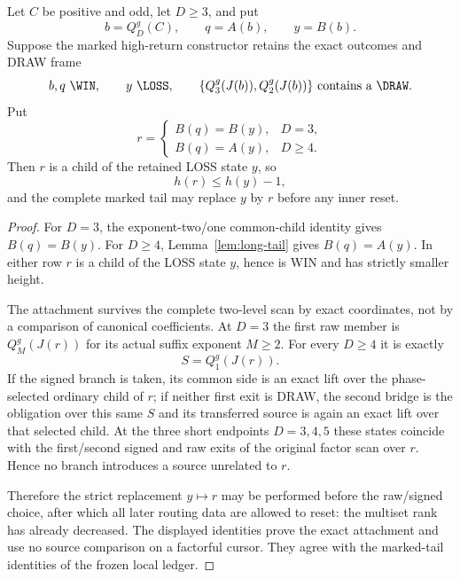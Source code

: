 \begin{lemma}
\label{lem:marked-tail-pay}
Let $C$ be positive and odd, let $D\ge3$, and put
\[
 b=Q_D^g(C),\qquad q=A(b),\qquad y=B(b).
\]
Suppose the marked high-return constructor retains the exact outcomes and
DRAW frame
\[
 b,q\text{ \WIN},\qquad y\text{ \LOSS},\qquad
 \{Q_3^g(J(b)),Q_2^g(J(b))\}\text{ contains a \DRAW}.
\]
Put
\[
 r=\begin{cases}
    B(q)=B(y),&D=3,\\
    B(q)=A(y),&D\ge4.
   \end{cases}
\]
Then $r$ is a \WIN child of the retained LOSS state $y$, so
\[
 h(r)\le h(y)-1,
\]
and the complete marked tail may replace $y$ by $r$ before any inner reset.
\end{lemma}

\begin{proof}
For $D=3$, the exponent-two/one common-child identity gives
$B(q)=B(y)$.  For $D\ge4$, Lemma~\ref{lem:long-tail} gives
$B(q)=A(y)$.  In either row $r$ is a child of the LOSS state $y$, hence is
WIN and has strictly smaller height.

The attachment survives the complete two-level scan by exact coordinates,
not by a comparison of canonical coefficients.  At $D=3$ the first raw
member is $Q_M^g(J(r))$ for its actual suffix exponent $M\ge2$.  For every
$D\ge4$ it is exactly
\[
 S=Q_1^g(J(r)).
\]
If the signed branch is taken, its common side is an exact lift over the
phase-selected ordinary child of $r$; if neither first exit is DRAW, the
second bridge is the obligation over this same $S$ and its transferred
source is again an exact lift over that selected child.  At the three short
endpoints $D=3,4,5$ these states coincide with the first/second signed and
raw exits of the original factor scan over $r$.  Hence no branch introduces
a source unrelated to $r$.

Therefore the strict replacement $y\mapsto r$ may be performed before the
raw/signed choice, after which all later routing data are allowed to reset:
the multiset rank has already decreased.  The displayed identities prove the exact attachment and use no source
comparison on a factorful cursor.  They agree with the marked-tail identities
of the frozen local ledger.
\end{proof}

